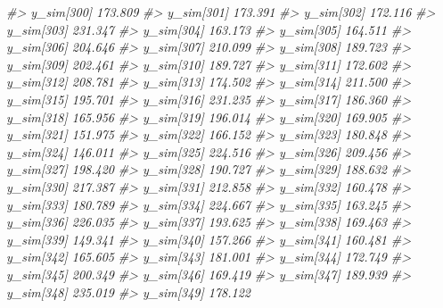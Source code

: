 \documentclass[
  10pt,
  italian,
  a4paper,
  extrafontsizes,onecolumn,openright
  ]{memoir}
\newenvironment{Shaded}{\begin{snugshade}}{\end{snugshade}}
\newcommand{\CommentTok}[1]{\textcolor[rgb]{0.56,0.35,0.01}{\textit{#1}}}
\begin{document}
\begin{Shaded}
\begin{Highlighting}[]
\CommentTok{\#\textgreater{}   y\_sim[300] 173.809}
\CommentTok{\#\textgreater{}   y\_sim[301] 173.391}
\CommentTok{\#\textgreater{}   y\_sim[302] 172.116}
\CommentTok{\#\textgreater{}   y\_sim[303] 231.347}
\CommentTok{\#\textgreater{}   y\_sim[304] 163.173}
\CommentTok{\#\textgreater{}   y\_sim[305] 164.511}
\CommentTok{\#\textgreater{}   y\_sim[306] 204.646}
\CommentTok{\#\textgreater{}   y\_sim[307] 210.099}
\CommentTok{\#\textgreater{}   y\_sim[308] 189.723}
\CommentTok{\#\textgreater{}   y\_sim[309] 202.461}
\CommentTok{\#\textgreater{}   y\_sim[310] 189.727}
\CommentTok{\#\textgreater{}   y\_sim[311] 172.602}
\CommentTok{\#\textgreater{}   y\_sim[312] 208.781}
\CommentTok{\#\textgreater{}   y\_sim[313] 174.502}
\CommentTok{\#\textgreater{}   y\_sim[314] 211.500}
\CommentTok{\#\textgreater{}   y\_sim[315] 195.701}
\CommentTok{\#\textgreater{}   y\_sim[316] 231.235}
\CommentTok{\#\textgreater{}   y\_sim[317] 186.360}
\CommentTok{\#\textgreater{}   y\_sim[318] 165.956}
\CommentTok{\#\textgreater{}   y\_sim[319] 196.014}
\CommentTok{\#\textgreater{}   y\_sim[320] 169.905}
\CommentTok{\#\textgreater{}   y\_sim[321] 151.975}
\CommentTok{\#\textgreater{}   y\_sim[322] 166.152}
\CommentTok{\#\textgreater{}   y\_sim[323] 180.848}
\CommentTok{\#\textgreater{}   y\_sim[324] 146.011}
\CommentTok{\#\textgreater{}   y\_sim[325] 224.516}
\CommentTok{\#\textgreater{}   y\_sim[326] 209.456}
\CommentTok{\#\textgreater{}   y\_sim[327] 198.420}
\CommentTok{\#\textgreater{}   y\_sim[328] 190.727}
\CommentTok{\#\textgreater{}   y\_sim[329] 188.632}
\CommentTok{\#\textgreater{}   y\_sim[330] 217.387}
\CommentTok{\#\textgreater{}   y\_sim[331] 212.858}
\CommentTok{\#\textgreater{}   y\_sim[332] 160.478}
\CommentTok{\#\textgreater{}   y\_sim[333] 180.789}
\CommentTok{\#\textgreater{}   y\_sim[334] 224.667}
\CommentTok{\#\textgreater{}   y\_sim[335] 163.245}
\CommentTok{\#\textgreater{}   y\_sim[336] 226.035}
\CommentTok{\#\textgreater{}   y\_sim[337] 193.625}
\CommentTok{\#\textgreater{}   y\_sim[338] 169.463}
\CommentTok{\#\textgreater{}   y\_sim[339] 149.341}
\CommentTok{\#\textgreater{}   y\_sim[340] 157.266}
\CommentTok{\#\textgreater{}   y\_sim[341] 160.481}
\CommentTok{\#\textgreater{}   y\_sim[342] 165.605}
\CommentTok{\#\textgreater{}   y\_sim[343] 181.001}
\CommentTok{\#\textgreater{}   y\_sim[344] 172.749}
\CommentTok{\#\textgreater{}   y\_sim[345] 200.349}
\CommentTok{\#\textgreater{}   y\_sim[346] 169.419}
\CommentTok{\#\textgreater{}   y\_sim[347] 189.939}
\CommentTok{\#\textgreater{}   y\_sim[348] 235.019}
\CommentTok{\#\textgreater{}   y\_sim[349] 178.122}

\end{Highlighting}
\end{Shaded}
\end{document}
